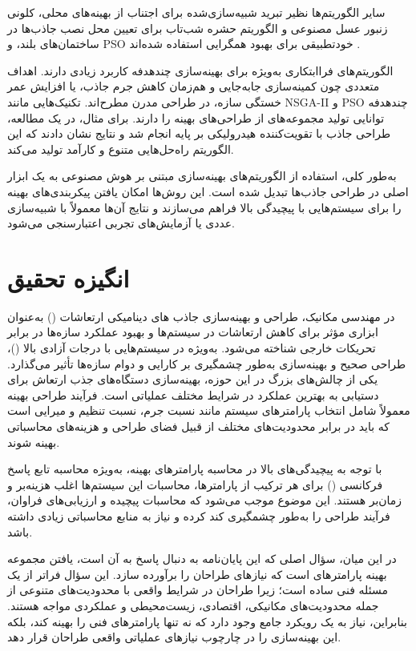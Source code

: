 سایر الگوریتم‌ها نظیر تبرید شبیه‌سازی‌شده برای اجتناب از بهینه‌های محلی، کلونی زنبور عسل مصنوعی و الگوریتم حشره شب‌تاب برای تعیین محل نصب جاذب‌ها در ساختمان‌های بلند، و PSO خودتطبیقی برای بهبود همگرایی استفاده شده‌اند \cite{zhe2019application}.

الگوریتم‌های فراابتکاری به‌ویژه برای بهینه‌سازی چندهدفه کاربرد زیادی دارند. اهداف متعددی چون کمینه‌سازی جابه‌جایی و هم‌زمان کاهش جرم جاذب، یا افزایش عمر خستگی سازه، در طراحی مدرن مطرح‌اند. تکنیک‌هایی مانند NSGA-II و PSO چندهدفه توانایی تولید مجموعه‌های  از طراحی‌های بهینه را دارند. برای مثال، در یک مطالعه، طراحی جاذب با تقویت‌کننده هیدرولیکی بر پایه  انجام شد و نتایج نشان دادند که این الگوریتم راه‌حل‌هایی متنوع و کارآمد تولید می‌کند.

به‌طور کلی، استفاده از الگوریتم‌های بهینه‌سازی مبتنی بر هوش مصنوعی به یک ابزار اصلی در طراحی جاذب‌ها تبدیل شده است. این روش‌ها امکان یافتن پیکربندی‌های بهینه را برای سیستم‌هایی با پیچیدگی بالا فراهم می‌سازند و نتایج آن‌ها معمولاً با شبیه‌سازی عددی یا آزمایش‌های تجربی اعتبارسنجی می‌شود.



\section{انگیزه تحقیق}

در مهندسی مکانیک، طراحی و بهینه‌سازی
جاذب های دینامیکی ارتعاشات () به‌عنوان ابزاری مؤثر برای کاهش ارتعاشات در سیستم‌ها و بهبود عملکرد سازه‌ها در برابر تحریکات خارجی شناخته می‌شود. به‌ویژه در سیستم‌هایی با درجات آزادی بالا ()، طراحی صحیح و بهینه‌سازی  به‌طور چشمگیری بر کارایی و دوام سازه‌ها تأثیر می‌گذارد. یکی از چالش‌های بزرگ در این حوزه، بهینه‌سازی دستگاه‌های جذب ارتعاش برای دستیابی به بهترین عملکرد در شرایط مختلف عملیاتی است. فرآیند طراحی بهینه معمولاً شامل انتخاب پارامترهای سیستم مانند نسبت جرم، نسبت تنظیم و میرایی است که باید در برابر محدودیت‌های مختلف از قبیل فضای طراحی و هزینه‌های محاسباتی بهینه شوند.

با توجه به پیچیدگی‌های بالا در محاسبه پارامترهای بهینه، به‌ویژه محاسبه تابع پاسخ فرکانسی () برای هر ترکیب از پارامترها، محاسبات این سیستم‌ها اغلب هزینه‌بر و زمان‌بر هستند. این موضوع موجب می‌شود که محاسبات پیچیده و ارزیابی‌های فراوان، فرآیند طراحی را به‌طور چشمگیری کند کرده و نیاز به منابع محاسباتی زیادی داشته باشد.

در این میان، سؤال اصلی که این پایان‌نامه به دنبال پاسخ به آن است، یافتن مجموعه بهینه پارامترهای  است که نیازهای طراحان را برآورده سازد. این سؤال فراتر از یک مسئله فنی ساده است؛ زیرا طراحان در شرایط واقعی با محدودیت‌های متنوعی از جمله محدودیت‌های مکانیکی، اقتصادی، زیست‌محیطی و عملکردی مواجه هستند. بنابراین، نیاز به یک رویکرد جامع وجود دارد که نه تنها پارامترهای فنی را بهینه کند، بلکه این بهینه‌سازی را در چارچوب نیازهای عملیاتی واقعی طراحان قرار دهد.


